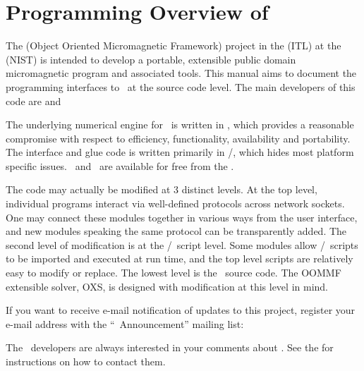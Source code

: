 \section{Programming Overview of \OOMMF}\label{sec:overview}
The
 (Object
Oriented Micromagnetic Framework) project in the
 (ITL) at the
 (NIST) is intended to develop a
portable, extensible public domain micromagnetic program and associated
tools.  This manual aims to document the programming interfaces to
\OOMMF\ at the source code level.  The main developers of this code are
and

The underlying numerical engine for \OOMMF\ is written in \Cplusplus,
which provides a reasonable compromise with respect to efficiency,
functionality, availability and portability.  The interface and glue
code is written primarily in \Tcl/\Tk, which hides most platform
specific issues. \Tcl\ and \Tk\ are available for free
from the
.

The code may actually be modified at 3 distinct levels.  At the top
level, individual programs interact via well-defined protocols across
network sockets.  One may connect these modules
together in various ways from the user interface, and new modules
speaking the same protocol can be transparently added.  The second level
of modification is at the \Tcl/\Tk\ script level.  Some modules allow
\Tcl/\Tk\ scripts to be imported and executed at run time, and the top
level scripts are relatively easy to modify or replace.  The lowest
level is the \Cplusplus\ source code.  The OOMMF extensible solver, OXS,
is designed with modification at this level in mind.

If you want to receive e-mail
notification of updates to this project, register
your e-mail address with the ``\mumag\ Announcement'' mailing list:
\begin{center}
\end{center}

The \OOMMF\ developers are always interested in your comments about
\OOMMF.  See the 
for instructions on how to contact them.
